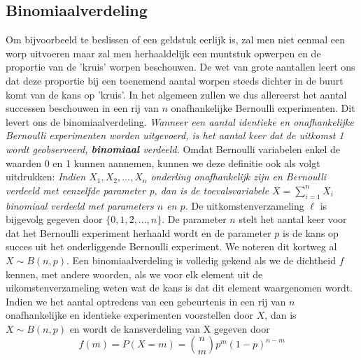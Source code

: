\documentclass[titlepage]{article}
\numberwithin{equation}{section}
\begin{document}
 \subsection{Binomiaalverdeling}
 Om bijvoorbeeld te beslissen of een geldstuk eerlijk is, zal men niet eenmal een worp uitvoeren maar zal men herhaaldelijk een muntstuk opwerpen en de proportie van de 'kruis' worpen beschouwen. De wet van grote aantallen leert ons dat deze proportie bij een toenemend aantal worpen steeds dichter in de buurt komt van de kans op 'kruis'.\newline\newline
 In het algemeen zullen we dus allereerst het aantal successen beschouwen in een rij van $n$ onafhankelijke Bernoulli experimenten. Dit levert ons de binomiaalverdeling.\newline\newline
 \emph{Wanneer een aantal identieke en onafhankelijke Bernoulli experimenten worden uitgevoerd, is het aantal keer dat de uitkomst 1 wordt geobserveerd, \textbf{binomiaal} verdeeld.}\newline\newline
 Omdat Bernoulli variabelen enkel de waarden 0 en 1 kunnen aannemen, kunnen we deze definitie ook als volgt uitdrukken:\newline\newline
 \emph{Indien $X_1, X_2, ... ,X_n$ onderling onafhankelijk zijn en Bernoulli verdeeld met eenzelfde parameter p, dan is de toevalsvariabele $X = \sum\limits_{i=1}^nX_i$ binomiaal verdeeld met parameters $n$ en $p$.}\newline\newline
 De uitkomstenverzameling $\ell$ is bijgevolg gegeven door $\{0, 1, 2, ... , n\}$. De parameter $n$ stelt het aantal keer voor dat het Bernoulli experiment herhaald wordt en de parameter $p$ is de kans op succes uit het onderliggende Bernoulli experiment. We noteren dit kortweg al $X \sim B(n,p)$.\newline\newline
 Een binomiaalverdeling is volledig gekend als we de dichtheid $f$ kennen, met andere woorden, als we voor elk element uit de uikomstenverzameling weten wat de kans is dat dit element waargenomen wordt.\newline\newline
 Indien we het aantal optredens van een gebeurtenis in een rij van $n$ onafhankelijke en identieke experimenten voorstellen door $X$, dan is $X \sim B(n,p)$ en wordt de kansverdeling van X gegeven door
 \begin{equation}
 	f(m)=P(X=m)= \binom{n}{m}p^m(1-p)^{n-m}
 	\label{4.3}
 \end{equation}
\end{document}
